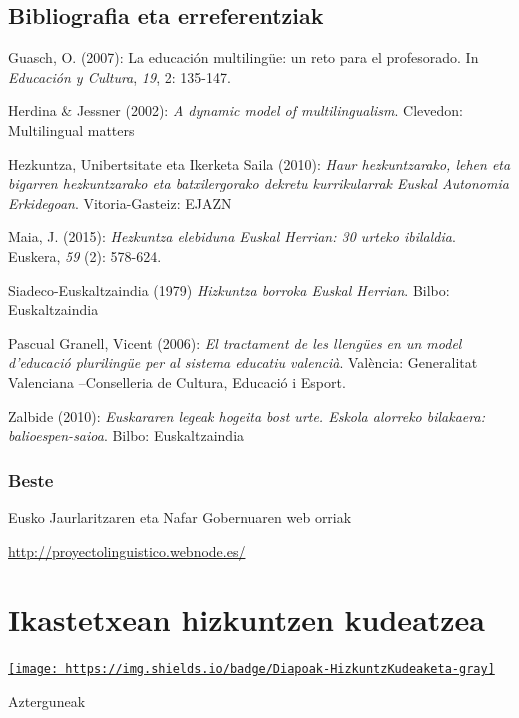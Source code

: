 \documentclass[
]{book}
\begin{document}
\hypertarget{bibliografia-eta-erreferentziak}{%
\section{Bibliografia eta erreferentziak}\label{bibliografia-eta-erreferentziak}}

Guasch, O. (2007): La educación multilingüe: un reto para el profesorado. In \emph{Educación y Cultura}, \emph{19}, 2: 135-147.

Herdina \& Jessner (2002): \emph{A dynamic model of multilingualism}. Clevedon: Multilingual matters

Hezkuntza, Unibertsitate eta Ikerketa Saila (2010): \emph{Haur hezkuntzarako, lehen eta bigarren hezkuntzarako eta batxilergorako dekretu kurrikularrak Euskal Autonomia Erkidegoan}. Vitoria-Gasteiz: EJAZN

Maia, J. (2015): \emph{Hezkuntza elebiduna Euskal Herrian: 30 urteko ibilaldia}. Euskera, \emph{59} (2): 578-624.

Siadeco-Euskaltzaindia (1979) \emph{Hizkuntza borroka Euskal Herrian}. Bilbo: Euskaltzaindia

Pascual Granell, Vicent (2006): \emph{El tractament de les llengües en un model d'educació plurilingüe per al sistema educatiu valencià}. València: Generalitat Valenciana --Conselleria de Cultura, Educació i Esport.

Zalbide (2010): \emph{Euskararen legeak hogeita bost urte. Eskola alorreko bilakaera: balioespen-saioa}. Bilbo: Euskaltzaindia

\hypertarget{beste}{%
\subsection*{Beste}\label{beste}}

Eusko Jaurlaritzaren eta Nafar Gobernuaren web orriak

\url{http://proyectolinguistico.webnode.es/}

\hypertarget{ikastetxean-hizkuntzen-kudeatzea}{%
\chapter{Ikastetxean hizkuntzen kudeatzea}\label{ikastetxean-hizkuntzen-kudeatzea}}

\href{../Zain/3-gaia_Ikastetxeko-hizkuntzen-kudeatzea.pdf}{\texttt{[image: https://img.shields.io/badge/Diapoak-HizkuntzKudeaketa-gray]}}

Azterguneak
\end{document}

